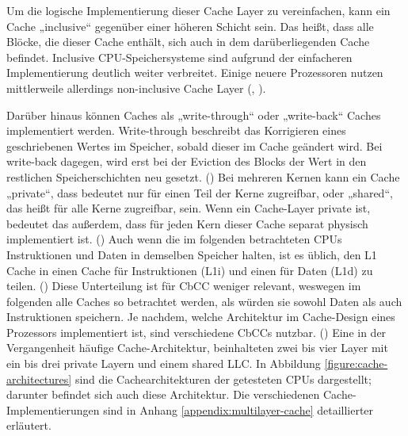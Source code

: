 Um die logische Implementierung dieser Cache Layer zu
vereinfachen, kann ein Cache „inclusive“ gegenüber einer höheren
Schicht sein. Das heißt, dass alle Blöcke, die dieser Cache
enthält, sich auch in dem darüberliegenden Cache befindet.
Inclusive \ac{CPU}-Speichersysteme sind aufgrund der
einfacheren Implementierung deutlich weiter verbreitet. Einige
neuere Prozessoren nutzen mittlerweile allerdings non-inclusive
Cache Layer (\cite[513]{sarangi_basic_2021},
\cite[4]{rauscher_systematic_2025}).

Darüber hinaus können Caches als „write-through“ oder
„write-back“ Caches implementiert werden. Write-through
beschreibt das Korrigieren eines geschriebenen Wertes im
Speicher, sobald dieser im Cache geändert wird. Bei write-back
dagegen, wird erst bei der Eviction des Blocks der Wert in
den restlichen Speicherschichten neu gesetzt.
(\cite[526,527]{sarangi_basic_2021})
Bei mehreren Kernen kann ein Cache „private“, dass bedeutet
nur für einen Teil der Kerne zugreifbar, oder „shared“, das heißt für
alle Kerne zugreifbar, sein. Wenn ein Cache-Layer private ist,
bedeutet das außerdem, dass für jeden Kern dieser Cache
separat physisch implementiert ist.
(\cite[593,594]{sarangi_basic_2021})
Auch wenn die im folgenden
betrachteten \acp{CPU} Instruktionen und Daten in demselben
Speicher halten, ist es üblich, den L1 Cache in einen Cache für
Instruktionen (L1i) und einen für Daten (L1d) zu teilen.
(\cite[3]{schwarz_zombieload_2019}) Diese Unterteilung ist
für \ac{CbCC} weniger relevant, weswegen im folgenden alle
Caches so betrachtet werden, als würden sie sowohl Daten als
auch Instruktionen speichern.
Je nachdem, welche Architektur im Cache-Design eines Prozessors
implementiert ist, sind verschiedene \acp{CbCC} nutzbar.
(\cite[4,5]{rauscher_systematic_2025})
Eine in der Vergangenheit häufige Cache-Architektur, beinhalteten
zwei bis vier Layer mit ein bis drei private Layern und einem
shared \ac{LLC}. In Abbildung \ref{figure:cache-architectures}
sind die Cachearchitekturen der getesteten \acp{CPU} dargestellt;
darunter befindet sich auch diese Architektur.
Die verschiedenen Cache-Implementierungen sind in Anhang
\ref{appendix:multilayer-cache} detaillierter erläutert.

